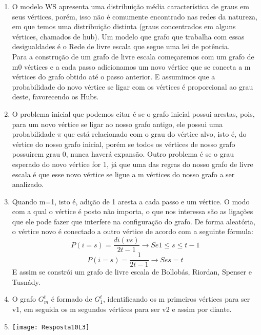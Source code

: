\documentclass[11pt,reqno]{amsart}
\begin{document}
\begin{enumerate}
		\vspace{1cm}

		\item O modelo WS apresenta uma distribuição média característica de graus em seus vértices, porém, 
		isso não é comumente encontrado nas redes da natureza, em que temos uma distribuição distinta 
		(graus concentrados em alguns vértices, chamados de hub). Um modelo que grafo que trabalha com 
		essas desigualdades é o Rede de livre escala que segue uma lei de potência. \\
		Para a construção de um grafo de livre escala começaremos com um grafo de m0 vértices e a cada passo
		adicionamos um novo vértice que se conecta a m vértices do grafo obtido até o passo anterior. E 
		assumimos que a probabilidade do novo vértice se ligar com os vértices é proporcional ao grau 
		deste, favorecendo os Hubs.

		\vspace{0.3cm}


		\item O problema inicial que podemos citar é se o grafo inicial possui arestas, pois, para um novo 
		vértice se ligar ao nosso grafo antigo, ele possui uma probabilidade $\pi$ que está relacionado com 
		o grau do vértice alvo, isto é, do vértice do nosso grafo inicial, porém se todos os vértices de 
		nosso grafo possuirem grau 0, nunca haverá expansão. Outro problema é se o grau esperado do novo 
		vértice for 1, já que uma das regras do nosso grafo de livre escala é que esse novo vértice se ligue
		a m vértices do nosso grafo a ser analizado. 

		\vspace{0.3cm}

		\item  Quando m=1, isto é, adição de 1 aresta a cada passo e um vértice. O modo com a qual o 
		vértice é posto não importa, o que nos interessa são as ligações que ele pode fazer que interfere 
		na configuração do grafo. De forma aleatória, o vértice novo é conectado a outro vértice de acordo 
		com a seguinte fórmula: \[P(i=s)=\frac{di(vs)}{2t-1} \rightarrow Se 1 \leq s \leq t-1\]
		\[P(i=s) = \frac{1}{2t-1} \rightarrow Se s = t\] E assim se constrói um grafo de livre escala de 
		Bollobás, Riordan, Spenser e Tusnády.

		\vspace{0.3cm}

		\item O grafo $G^t_m$ é formado de $G^t_1$, identificando os m primeiros vértices para ser v1, em 
		seguida os m segundos vértices para ser v2 e assim por diante.

		\vspace{0.3cm}

		\item \begin{minipage}{\linewidth}
		\centering
		\texttt{[image: Resposta10L3]}
		\end{minipage}

	\end{enumerate}
\end{document}
